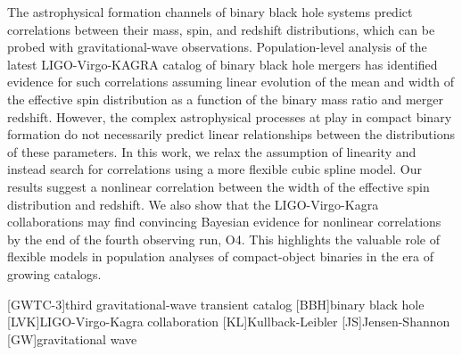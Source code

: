 \begin{refsection}
\label{chapter: splines}
\begin{chapterabstract}
The astrophysical formation channels of binary black hole systems predict correlations between their mass, spin, and redshift distributions, which can be probed with gravitational-wave observations. Population-level analysis of the latest LIGO-Virgo-KAGRA catalog of binary black hole mergers has identified evidence for such correlations assuming linear evolution of the mean and width of the effective spin distribution as a function of the binary mass ratio and merger redshift. However, the complex astrophysical processes at play in compact binary formation do not necessarily predict linear relationships between the distributions of these parameters.
In this work, we relax the assumption of linearity and instead search for correlations using a more flexible cubic spline model. Our results suggest a nonlinear correlation between the width of the effective spin distribution and redshift. We also show that the LIGO-Virgo-Kagra collaborations may find convincing Bayesian evidence for nonlinear correlations by the end of the fourth observing run, O4. This highlights the valuable role of flexible models in population analyses of compact-object binaries in the era of growing catalogs.
\end{chapterabstract}

[GWTC-3]{third gravitational-wave transient catalog}
[BBH]{binary black hole}
[LVK]{LIGO-Virgo-Kagra collaboration}
[KL]{Kullback-Leibler}
[JS]{Jensen-Shannon}
[GW]{gravitational wave}



\end{refsection}
